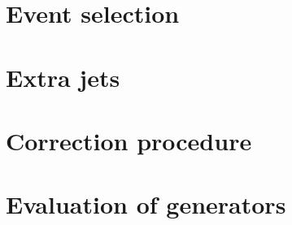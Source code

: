 \section{Event selection}
\section{Extra jets}
\section{Correction procedure}
\section{Evaluation of generators}